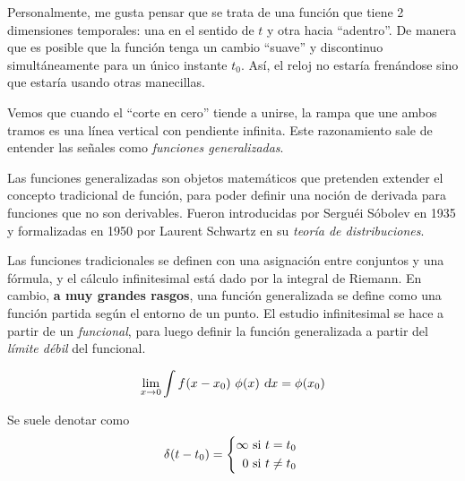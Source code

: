 Personalmente, me gusta pensar que se trata de una función que tiene 2 dimensiones temporales: una en el sentido de $t$ y otra hacia ``adentro''.
De manera que es posible que la función tenga un cambio ``suave'' y discontinuo simultáneamente para un único instante $t_0$.
Así, el reloj no estaría frenándose sino que estaría usando otras manecillas.

Vemos que cuando el ``corte en cero'' tiende a unirse, la rampa que une ambos tramos es una línea vertical con pendiente infinita.
Este razonamiento sale de entender las señales como \emph{funciones generalizadas}.

Las funciones generalizadas son objetos matemáticos que pretenden extender el concepto tradicional de función, para poder definir una noción de derivada para funciones que no son derivables.
Fueron introducidas por Serguéi Sóbolev en 1935 y formalizadas en 1950 por Laurent Schwartz en su \emph{teoría de distribuciones}.

Las funciones tradicionales se definen con una asignación entre conjuntos y una fórmula, y el cálculo infinitesimal está dado por la integral de Riemann.
En cambio, \textbf{a muy grandes rasgos}, una función generalizada se define como una función partida según el entorno de un punto.
El estudio infinitesimal se hace a partir de un \emph{funcional}, para luego definir la función generalizada a partir del \emph{límite débil} del funcional.

\begin{mdframed}[style=PropertyFrame]
    \begin{prop}
        \label{prop:limDebil}
    \end{prop}
    \begin{equation*}
        \lim_{x \to 0} \int \fx{x-x_0} \, \fx[\phi]{x} \, \dif x = \fx[\phi]{x_0}
    \end{equation*}
\end{mdframed}


Se suele denotar como
\begin{equation*}
    \fx[\delta]{t-t_0} =
    \left\{
    \begin{aligned}
        \infty \text{ si $t=t_0$ }
        \\
        0 \text{ si $t \neq t_0$ }
    \end{aligned}
    \right.
\end{equation*}

